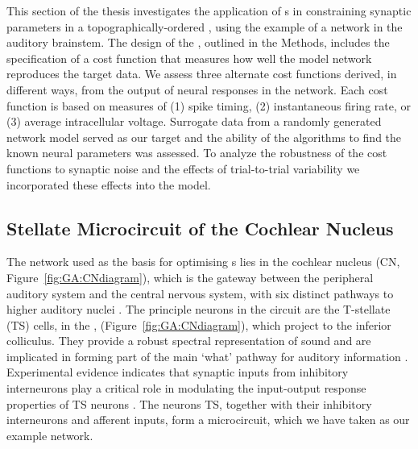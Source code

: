 \smallskip{} 

This section of the thesis investigates the application of {\GA}s in
constraining synaptic parameters in a topographically-ordered {\BNN},
using the example of a network in the auditory brainstem. The design
of the {\GA}, outlined in the Methods, includes the specification of a
cost function that measures how well the model network reproduces the
target data. We assess three alternate cost functions derived, in
different ways, from the output of neural responses in the
network. Each cost function is based on measures of (1) spike timing,
(2) instantaneous firing rate, or (3) average intracellular
voltage. Surrogate data from a randomly generated network model served
as our target and the ability of the algorithms to find the known
neural parameters was assessed. To analyze the robustness of the cost
functions to synaptic noise and the effects of trial-to-trial
variability we incorporated these effects into the model.

\subsection{Stellate Microcircuit of the Cochlear
  Nucleus}\label{sec:GA:stell-micr-cochl}

The network used as the basis for optimising {\BNN}s lies in the cochlear
nucleus (CN, Figure~\ref{fig:GA:CNdiagram}), which is the gateway
between the peripheral auditory system and the central nervous system,
with six distinct pathways to higher auditory nuclei
\citep{CantBenson:2003}. The principle neurons in the circuit are the
T-stellate (TS) cells, in the \VCN,
(Figure~\ref{fig:GA:CNdiagram}), which project to the inferior
colliculus.  They provide a robust spectral representation of sound
and are implicated in forming part of the main `what' pathway for
auditory information \citep{YoungOertel:2004}. Experimental evidence
indicates that synaptic inputs from inhibitory interneurons play a
critical role in modulating the input-output response properties of TS
neurons
\citep{FerragamoGoldingEtAl:1998,NeedhamPaolini:2006,PaoliniClareyEtAl:2005}.
The neurons TS, together with their inhibitory interneurons and
afferent inputs, form a microcircuit, which we have taken as our
example network.



